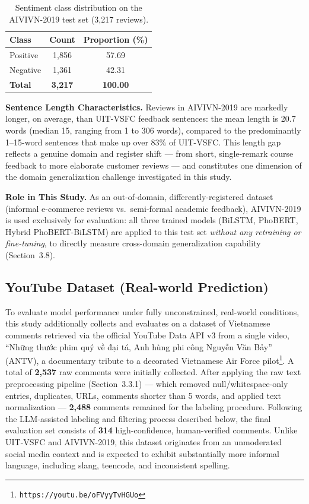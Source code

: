 \documentclass[12pt]{report} %
\begin{document}
\begin{table}[htbp]
    \centering
    \caption{Sentiment class distribution on the AIVIVN-2019 test set (3,217 reviews).}
    \label{tab:aivivn-dist}
    \begin{tabular}{lcc}
        \hline
        \textbf{Class} & \textbf{Count} & \textbf{Proportion (\%)} \\
        \hline
        Positive       & 1,856          & 57.69                    \\
        Negative       & 1,361          & 42.31                    \\
        \hline
        \textbf{Total} & \textbf{3,217} & \textbf{100.00}          \\
        \hline
    \end{tabular}
\end{table}

\textbf{Sentence Length Characteristics.} Reviews in AIVIVN-2019 are markedly longer, on average, than UIT-VSFC feedback sentences: the mean length is 20.7 words (median 15, ranging from 1 to 306 words), compared to the predominantly 1--15-word sentences that make up over 83\% of UIT-VSFC. This length gap reflects a genuine domain and register shift --- from short, single-remark course feedback to more elaborate customer reviews --- and constitutes one dimension of the domain generalization challenge investigated in this study.

\textbf{Role in This Study.} As an out-of-domain, differently-registered dataset (informal e-commerce reviews vs.\ semi-formal academic feedback), AIVIVN-2019 is used exclusively for evaluation: all three trained models (BiLSTM, PhoBERT, Hybrid PhoBERT-BiLSTM) are applied to this test set \textit{without any retraining or fine-tuning}, to directly measure cross-domain generalization capability (Section~3.8).

\subsection{YouTube Dataset (Real-world Prediction)}


To evaluate model performance under fully unconstrained, real-world conditions, this study additionally collects and evaluates on a dataset of Vietnamese comments retrieved via the official YouTube Data API v3 from a single video, ``Những thước phim quý về đại tá, Anh hùng phi công Nguyễn Văn Bảy'' (ANTV), a documentary tribute to a decorated Vietnamese Air Force pilot\footnote{\texttt{https://youtu.be/oFVyyTvHGUo}}. A total of \textbf{2,537} raw comments were initially collected. After applying the raw text preprocessing pipeline (Section~3.3.1) --- which removed null/whitespace-only entries, duplicates, URLs, comments shorter than 5 words, and applied text normalization --- \textbf{2,488} comments remained for the labeling procedure. Following the LLM-assisted labeling and filtering process described below, the final evaluation set consists of \textbf{314} high-confidence, human-verified comments. Unlike UIT-VSFC and AIVIVN-2019, this dataset originates from an unmoderated social media context and is expected to exhibit substantially more informal language, including slang, teencode, and inconsistent spelling.
\end{document}
